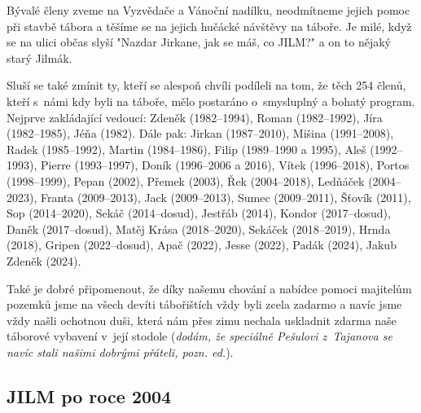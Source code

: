 \documentclass[a5paper, 12pt, twoside]{article}
\begin{document}
Bývalé členy zveme na Vyzvědače a Vánoční nadílku, neodmítneme jejich
pomoc při stavbě tábora a těšíme se na jejich hučácké návštěvy na
táboře. Je milé, když se na ulici občas slyší "Nazdar Jirkane, jak se
máš, co JILM?{}" a on to nějaký starý Jilmák.

Sluší se také zmínit ty, kteří se alespoň chvíli podíleli na tom, že
těch 254 členů, kteří s~námi kdy byli na táboře, mělo postaráno
o~smysluplný a bohatý program. Nejprve zakládající vedoucí: Zdeněk
(1982--1994), Roman (1982--1992), Jíra (1982--1985), Jéňa (1982). Dále
pak: Jirkan (1987--2010), Mišina (1991--2008), Radek (1985--1992),
Martin (1984--1986), Filip (1989--1990 a 1995), Aleš (1992--1993),
Pierre (1993--1997), Doník (1996--2006 a 2016), Vítek (1996--2018),
Portos (1998--1999), Pepan (2002), Přemek (2003), Řek (2004--2018),
Ledňáček (2004--2023), Franta (2009--2013), Jack (2009--2013), Sumec
(2009--2011), Šťovík (2011), Sop (2014--2020), Sekáč (2014--dosud),
Jestřáb (2014), Kondor (2017--dosud), Daněk (2017--dosud), Matěj Krása
(2018--2020), Sekáček (2018--2019), Hrnda (2018), Gripen (2022--dosud),
Apač (2022), Jesse (2022), Padák (2024), Jakub Zdeněk (2024).

Také je dobré připomenout, že díky našemu chování a nabídce pomoci
majitelům pozemků jsme na všech devíti tábořištích vždy byli zcela
zadarmo a navíc jsme vždy našli ochotnou duši, která nám přes zimu
nechala uskladnit zdarma naše táborové vybavení v~její stodole
(\textit{dodám, že speciálně Pešulovi z~Tajanova se navíc stali našimi
dobrými přáteli, pozn. ed.}).

\subsection{JILM po roce 2004}
\end{document}
